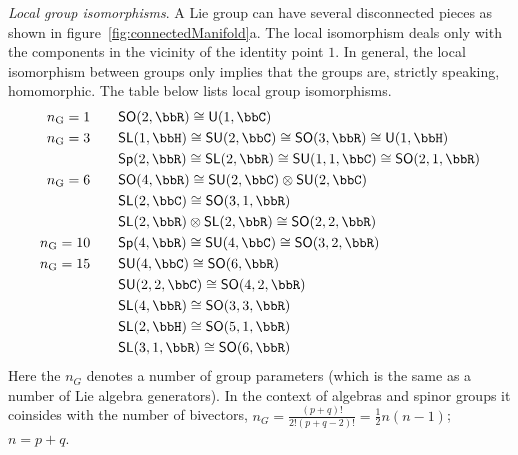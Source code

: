 \begin{unit}\textit{Local group isomorphisms}.\label{groupisomorph}
A Lie group can have several disconnected pieces as shown in
figure~\ref{fig:connectedManifold}a. The local isomorphism deals
only with the components in the vicinity of the identity point
$1$. In general, the local isomorphism between groups only implies that the
groups are, strictly speaking, homomorphic. The table below lists local group isomorphisms.
\[\begin{split}
n_{\mathrm{G}}=1\qquad&\mathsf{SO}(2,\bbR)\cong\mathsf{U}(1,\bbC)\\
n_{\mathrm{G}}=3\qquad&\mathsf{SL}(1,\bbH)\cong\mathsf{SU}(2,\bbC)\cong\mathsf{SO}(3,\bbR)\cong
\mathsf{U}(1,\bbH)\\
&\mathsf{Sp}(2,\bbR)\cong\mathsf{SL}(2,\bbR)\cong
\mathsf{SU}(1,1,\bbC)\cong\mathsf{SO}(2,1,\bbR)\\
n_{\mathrm{G}}=6\qquad&\mathsf{SO}(4,\bbR)\cong\mathsf{SU}(2,\bbC)\otimes\mathsf{SU}(2,\bbC)\\
&\mathsf{SL}(2,\bbC)\cong\mathsf{SO}(3,1,\bbR)\\
&\mathsf{SL}(2,\bbR)\otimes\mathsf{SL}(2,\bbR)\cong\mathsf{SO}(2,2,\bbR)\\
n_{\mathrm{G}}=10\qquad&\mathsf{Sp}(4,\bbR)\cong\mathsf{SU}(4,\bbC)\cong\mathsf{SO}(3,2,\bbR)\\
n_{\mathrm{G}}=15\qquad&\mathsf{SU}(4,\bbC)\cong\mathsf{SO}(6,\bbR)\\
&\mathsf{SU}(2,2,\bbC)\cong\mathsf{SO}(4,2,\bbR)\\
&\mathsf{SL}(4,\bbR)\cong\mathsf{SO}(3,3,\bbR)\\
&\mathsf{SL}(2,\bbH)\cong\mathsf{SO}(5,1,\bbR)\\
&\mathsf{SL}(3,1,\bbR)\cong\mathsf{SO}(6,\bbR)\\
\end{split}\]
Here the $n_G$ denotes a number of group parameters (which is the
same as a number of Lie algebra generators). In the context of
 algebras and spinor groups it coinsides with the
number of bivectors, $n_G=\frac{(p+q)!}{2!(p+q-2)!}=\tfrac{1}{2}n(n-1)$; $n=p+q$.
\end{unit}
%
